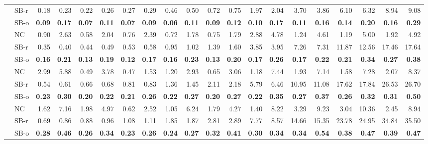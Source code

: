 \documentclass[runningheads,a4paper]{llncs}
\begin{document}
\begin{sidewaystable}
\begin{tabularx}{1\textwidth}{p{0.8cm}p{0.8cm}|RR|RR|RR|RR|RR|RR|RR|RR|RR}
 & \centering SB-r  & 0.18 & 0.23 & 0.22 & 0.26 & 0.27 & 0.29 & 0.46 & 0.50 & 0.72 & 0.75 & 1.97 & 2.04 & 3.70 & 3.86 & 6.10 & 6.32 & 8.94 & 9.08 \\
 & \centering SB-o  & \textbf{0.09} & \textbf{0.17} & \textbf{0.07} & \textbf{0.11} & \textbf{0.07} & \textbf{0.09} & \textbf{0.06} & \textbf{0.11} & \textbf{0.09} & \textbf{0.12} & \textbf{0.10} & \textbf{0.17} & \textbf{0.11} & \textbf{0.16} & \textbf{0.14} & \textbf{0.20} & \textbf{0.16} & \textbf{0.29} \\
\hline
\centering{} & \centering NC & 0.90 & 2.63 & 0.58 & 2.04 & 0.76 & 2.39 & 0.72 & 1.78 & 0.75 & 1.79 & 2.88 & 4.78 & 1.24 & 4.61 & 1.19 & 5.00 & 1.92 & 4.92 \\
 & \centering SB-r  & 0.35 & 0.40 & 0.44 & 0.49 & 0.53 & 0.58 & 0.95 & 1.02 & 1.39 & 1.60 & 3.85 & 3.95 & 7.26 & 7.31 & 11.87 & 12.56 & 17.46 & 17.64 \\
 & \centering SB-o  & \textbf{0.16} & \textbf{0.21} & \textbf{0.13} & \textbf{0.19} & \textbf{0.12} & \textbf{0.17} & \textbf{0.16} & \textbf{0.23} & \textbf{0.13} & \textbf{0.20} & \textbf{0.17} & \textbf{0.26} & \textbf{0.17} & \textbf{0.22} & \textbf{0.21} & \textbf{0.34} & \textbf{0.27} & \textbf{0.38} \\
\hline
\centering{} & \centering NC & 2.99 & 5.88 & 0.49 & 3.78 & 0.47 & 1.53 & 1.20 & 2.93 & 0.65 & 3.06 & 1.18 & 7.44 & 1.93 & 7.14 & 1.58 & 7.28 & 2.07 & 8.37 \\
 & \centering SB-r  & 0.54 & 0.61 & 0.66 & 0.68 & 0.81 & 0.83 & 1.36 & 1.45 & 2.11 & 2.18 & 5.79 & 6.46 & 10.95 & 11.08 & 17.62 & 17.84 & 26.53 & 26.70 \\
 & \centering SB-o  & \textbf{0.23} & \textbf{0.30} & \textbf{0.20} & \textbf{0.22} & \textbf{0.21} & \textbf{0.26} & \textbf{0.22} & \textbf{0.27} & \textbf{0.20} & \textbf{0.27} & \textbf{0.22} & \textbf{0.35} & \textbf{0.27} & \textbf{0.37} & \textbf{0.26} & \textbf{0.32} & \textbf{0.31} & \textbf{0.50} \\
\hline
\centering{} & \centering NC & 1.62 & 7.16 & 1.98 & 4.97 & 0.62 & 2.52 & 1.05 & 6.24 & 1.79 & 4.27 & 1.40 & 8.22 & 3.29 & 9.23 & 3.04 & 10.36 & 2.45 & 8.94 \\
 & \centering SB-r  & 0.69 & 0.86 & 0.88 & 0.96 & 1.08 & 1.11 & 1.85 & 1.87 & 2.81 & 2.89 & 7.77 & 8.57 & 14.66 & 15.35 & 23.78 & 24.95 & 34.84 & 35.50 \\
 & \centering SB-o  & \textbf{0.28} & \textbf{0.46} & \textbf{0.26} & \textbf{0.34} & \textbf{0.23} & \textbf{0.26} & \textbf{0.24} & \textbf{0.27} & \textbf{0.32} & \textbf{0.41} & \textbf{0.30} & \textbf{0.34} & \textbf{0.34} & \textbf{0.54} & \textbf{0.38} & \textbf{0.47} & \textbf{0.39} & \textbf{0.47} \\

\end{tabularx}
\end{sidewaystable}
\end{document}
